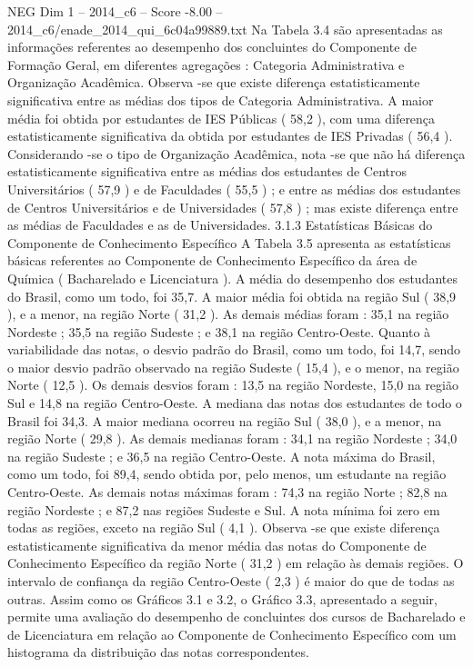 \begin{textsample}{NEG Dim 1 – 2014\_c6 – Score -8.00 – 2014\_c6/enade\_2014\_qui\_6c04a99889.txt}
Na Tabela 3.4 são apresentadas as informações referentes ao desempenho dos concluintes do Componente de Formação Geral, em diferentes agregações : Categoria Administrativa e Organização Acadêmica.
Observa -se que existe diferença estatisticamente significativa entre as médias dos tipos de Categoria Administrativa.
A maior média foi obtida por estudantes de IES Públicas ( 58,2 ), com uma diferença estatisticamente significativa da obtida por estudantes de IES Privadas ( 56,4 ).
Considerando -se o tipo de Organização Acadêmica, nota -se que não há diferença estatisticamente significativa entre as médias dos estudantes de Centros Universitários ( 57,9 ) e de Faculdades ( 55,5 ) ; e entre as médias dos estudantes de Centros Universitários e de Universidades ( 57,8 ) ; mas existe diferença entre as médias de Faculdades e as de Universidades. 3.1.3 Estatísticas Básicas do Componente de Conhecimento Específico A Tabela 3.5 apresenta as estatísticas básicas referentes ao Componente de Conhecimento Específico da área de Química ( Bacharelado e Licenciatura ).
A média do desempenho dos estudantes do Brasil, como um todo, foi 35,7.
A maior média foi obtida na região Sul ( 38,9 ), e a menor, na região Norte ( 31,2 ).
As demais médias foram : 35,1 na região Nordeste ; 35,5 na região Sudeste ; e 38,1 na região Centro-Oeste.
Quanto à variabilidade das notas, o desvio padrão do Brasil, como um todo, foi 14,7, sendo o maior desvio padrão observado na região Sudeste ( 15,4 ), e o menor, na região Norte ( 12,5 ).
Os demais desvios foram : 13,5 na região Nordeste, 15,0 na região Sul e 14,8 na região Centro-Oeste.
A mediana das notas dos estudantes de todo o Brasil foi 34,3.
A maior mediana ocorreu na região Sul ( 38,0 ), e a menor, na região Norte ( 29,8 ).
As demais medianas foram : 34,1 na região Nordeste ; 34,0 na região Sudeste ; e 36,5 na região Centro-Oeste.
A nota máxima do Brasil, como um todo, foi 89,4, sendo obtida por, pelo menos, um estudante na região Centro-Oeste.
As demais notas máximas foram : 74,3 na região Norte ; 82,8 na região Nordeste ; e 87,2 nas regiões Sudeste e Sul.
A nota mínima foi zero em todas as regiões, exceto na região Sul ( 4,1 ).
Observa -se que existe diferença estatisticamente significativa da menor média das notas do Componente de Conhecimento Específico da região Norte ( 31,2 ) em relação às demais regiões.
O intervalo de confiança da região Centro-Oeste ( 2,3 ) é maior do que de todas as outras.
Assim como os Gráficos 3.1 e 3.2, o Gráfico 3.3, apresentado a seguir, permite uma avaliação do desempenho de concluintes dos cursos de Bacharelado e de Licenciatura em relação ao Componente de Conhecimento Específico com um histograma da distribuição das notas correspondentes.

\end{textsample}
